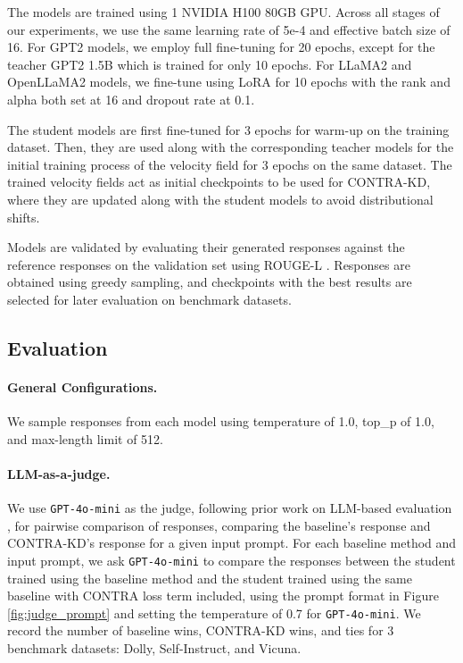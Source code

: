 \documentclass{article} %
\theoremstyle{definition}
\theoremstyle{remark}
\begin{document}
The models are trained using 1 NVIDIA H100 80GB GPU. Across all stages of our experiments, we use the same learning rate of 5e-4 and effective batch size of 16. For GPT2 models, we employ full fine-tuning for 20 epochs, except for the teacher GPT2 1.5B which is trained for only 10 epochs. For LLaMA2 and OpenLLaMA2 models, we fine-tune using LoRA \cite{hu2022lora} for 10 epochs with the rank and alpha both set at 16 and dropout rate at 0.1.

The student models are first fine-tuned for 3 epochs for warm-up on the training dataset. Then, they are used along with the corresponding teacher models for the initial training process of the velocity field for 3 epochs on the same dataset. The trained velocity fields act as initial checkpoints to be used for CONTRA-KD, where they are updated along with the student models to avoid distributional shifts.

Models are validated by evaluating their generated responses against the reference responses on the validation set using ROUGE-L \cite{lin-2004-rouge}. Responses are obtained using greedy sampling, and checkpoints with the best results are selected for later evaluation on benchmark datasets.

\subsection{Evaluation}
\paragraph{General Configurations.}
We sample responses from each model using temperature of 1.0, top\_p of 1.0, and max-length limit of 512.

\paragraph{LLM-as-a-judge.}
We use \texttt{GPT-4o-mini} as the judge, following prior work on LLM-based evaluation \cite{zheng2023judgingllmasajudgemtbenchchatbot}, for pairwise comparison of responses, comparing the baseline's response and CONTRA-KD's response for a given input prompt. For each baseline method and input prompt, we ask \texttt{GPT-4o-mini} to compare the responses between the student trained using the baseline method and the student trained using the same baseline with CONTRA loss term included, using the prompt format in Figure \ref{fig:judge_prompt} and setting the temperature of 0.7 for \texttt{GPT-4o-mini}. We record the number of baseline wins, CONTRA-KD wins, and ties for 3 benchmark datasets: Dolly, Self-Instruct, and Vicuna.
\end{document}
